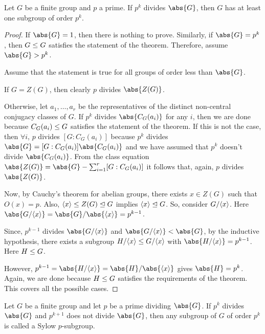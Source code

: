\documentclass[11pt]{penrose}
\begin{document}
\begin{nthm}
    Let $G$ be a finite group and $p$ a prime. If $p^{k}$ divides $\abs{G}$, then $G$ has at least one subgroup of order $p^{k}$.
\end{nthm}
\begin{proof}
    If $\abs{G} = 1$, then there is nothing to prove. Similarly, if $\abs{G} = p^{k}$, then $G \mathrel{\leq} G$ satisfies the statement of the theorem. Therefore, assume $\abs{G} > p^{k}$.

    Assume that the statement is true for all groups of order less than $\abs{G}$.

    If $G = Z(G)$, then clearly $p$ divides $\abs{Z(G)}$.

    Otherwise, let $a_{1}, \dots, a_{r}$ be the representatives of the distinct non-central conjugacy classes of $G$. If $p^{k}$ divides $\abs{C_{G}(a_{i})}$ for any $i$, then we are done because $C_{G}(a_{i}) \mathrel{\leq} G$ satisfies the statement of the theorem. If this is not the case, then $\forall i$, $p$ divides $[G : C_{G}(a_{i})]$ because $p^{k}$ divides $\abs{G} = [G : C_{G}(a_{i})] \abs{C_{G}(a_{i})}$ and we have assumed that $p^{k}$ doesn't divide $\abs{C_{G}(a_{i})}$. From the class equation $\abs{Z(G)} = \abs{G} - \sum_{i=1}^{r} \comm{G : C_{G}(a_{i})}$ it follows that, again, $p$ divides $\abs{Z(G)}$.

    Now, by Cauchy's theorem for abelian groups, there exists $x \in Z(G)$ such that $O(x) = p$. Also, $\langle x\rangle \mathrel{\leq} Z(G) \mathrel{\trianglelefteq} G$ implies $\langle x\rangle \mathrel{\trianglelefteq} G$. So, consider $G / \langle x\rangle$. Here $\abs{G / \cyclic{x}} = \abs{G} / \abs{\cyclic{x}} = p^{k-1}$.

    Since, $p^{k-1}$ divides $\abs{G / \cyclic{x}}$ and $\abs{G / \cyclic{x}} < \abs{G}$, by the inductive hypothesis, there exists a subgroup $H / \langle x\rangle \mathrel{\leq} G / \langle x\rangle$ with $\abs{H / \cyclic{x}} = p^{k-1}$. Here $H \mathrel{\leq} G$.

    However, $p^{k-1} = \abs{H / \cyclic{x}} = \abs{H} / \abs{\cyclic{x}}$ gives $\abs{H} = p^{k}$. Again, we are done because $H \mathrel{\leq} G$ satisfies the requirements of the theorem. This covers all the possible cases.
\end{proof}

\begin{ndfn}
    Let $G$ be a finite group and let $p$ be a prime dividing $\abs{G}$. If $p^{k}$ divides $\abs{G}$ and $p^{k+1} $ does not divide $\abs{G}$, then any subgroup of $G$ of order $p^{k}$ is called a Sylow $p$-subgroup.
\end{ndfn}
\end{document}
